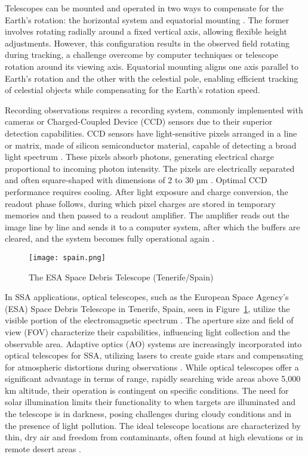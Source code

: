 Telescopes can be mounted and operated in two ways to compensate for the Earth's rotation: the horizontal system and equatorial mounting \cite{mount}. The former involves rotating radially around a fixed vertical axis, allowing flexible height adjustments. However, this configuration results in the observed field rotating during tracking, a challenge overcome by computer techniques or telescope rotation around its viewing axis. Equatorial mounting aligns one axis parallel to Earth's rotation and the other with the celestial pole, enabling efficient tracking of celestial objects while compensating for the Earth's rotation speed.

Recording observations requires a recording system, commonly implemented with cameras or Charged-Coupled Device (CCD) sensors due to their superior detection capabilities. CCD sensors have light-sensitive pixels arranged in a line or matrix, made of silicon semiconductor material, capable of detecting a broad light spectrum \cite{ccd}. These pixels absorb photons, generating electrical charge proportional to incoming photon intensity. The pixels are electrically 
separated and often square-shaped with dimensions of 2 to 30 µm \cite{ccd}. Optimal CCD performance requires cooling. After light exposure and charge conversion, the readout phase follows, during which pixel charges are stored in temporary memories and then passed to a readout amplifier. The amplifier reads out the image line by line and sends it to a computer system, after which the buffers are cleared, and the system becomes fully operational again \cite{ccd}.
\begin{figure}[h!]
	\centering
	\texttt{[image: spain.png]}
	\caption{The ESA Space Debris Telescope (Tenerife/Spain)\cite{spain}}\label{fig:spa}
\end{figure}

In SSA applications, optical telescopes, such as the European Space Agency's (ESA) Space Debris Telescope in Tenerife, Spain, seen in Figure~\ref{fig:spa}, utilize the visible portion of the electromagnetic spectrum \cite{weeden}. The aperture size and field of view (FOV) characterize their capabilities, influencing light collection and the observable area. Adaptive optics (AO) systems are increasingly incorporated into optical telescopes for SSA, utilizing lasers to create guide stars and compensating for atmospheric distortions during observations \cite{weeden}.
While optical telescopes offer a significant advantage in terms of range, rapidly searching wide areas above 5,000 km altitude, their operation is contingent on specific conditions. The need for solar illumination limits their functionality to when targets are illuminated and the telescope is in darkness, posing challenges during cloudy conditions and in the presence of light pollution. The ideal telescope locations are characterized by thin, dry air and freedom from contaminants, often found at high elevations or in remote desert areas \cite{weeden}.


